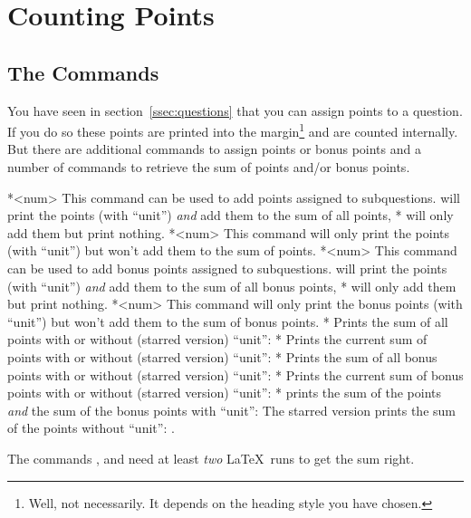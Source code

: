 \documentclass[DIV10,toc=index,toc=bib,numbers=noendperiod]{cnpkgdoc}
\begin{document}

\section{Counting Points}\label{sec:points}
\subsection{The Commands}
You have seen in section~\ref{ssec:questions} that you can assign points to a
question.  If you do so these points are printed into the
margin\footnote{Well, not necessarily.  It depends on the heading style you
  have chosen.} and are counted internally.  But there are additional commands
to assign points or bonus points and a number of commands to retrieve the sum
of points and/or bonus points.
\begin{beschreibung}
  *{<num>}\newline
    This command can be used to add points assigned to subquestions.
     will print the points (with ``unit'') \emph{and} add them
    to the sum of all points, * will only add them but print
    nothing.
  *{<num>}\newline
    This command will only print the points (with ``unit'') but won't add them
    to the sum of points.
  *{<num>}\newline
    This command can be used to add bonus points assigned to subquestions.
     will print the points (with ``unit'') \emph{and} add them
    to the sum of all bonus points, * will only add them but
    print nothing.
  *{<num>}\newline
    This command will only print the bonus points (with ``unit'') but won't
    add them to the sum of bonus points.
  *\newline
    Prints the sum of all points with or without (starred version) ``unit'':
    \pointssum
  *\newline
    Prints the current sum of points with or without (starred version)
    ``unit'': \currentpointssum
  *\newline
    Prints the sum of all bonus points with or without (starred version)
    ``unit'': \bonussum
  *\newline
    Prints the current sum of bonus points with or without (starred version)
    ``unit'': \currentbonussum
  *\newline
    prints the sum of the points \emph{and} the sum of the bonus points with
    ``unit'': \totalpoints\space The starred version prints the sum of the
    points without ``unit'': \totalpoints*.
\end{beschreibung}
The commands ,  and  need at
least \emph{two} \LaTeX\ runs to get the sum right.
\end{document}
